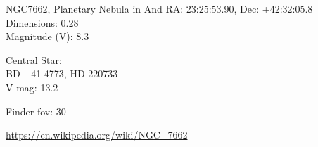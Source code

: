 \begin{block}{NGC7662, Planetary Nebula in And}
    RA: 23:25:53.90, Dec: +42:32:05.8 \\ 
    Dimensions: 0.28 \\ 
    Magnitude (V): 8.3


    Central Star: \\ 
      \hspace{1em}BD +41 4773, HD 220733 \\ 
      \hspace{1em}V-mag: 13.2 


    Finder fov: 30 

    \url{https://en.wikipedia.org/wiki/NGC_7662} 
\end{block}